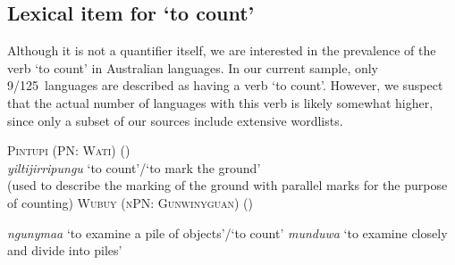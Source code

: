 \documentclass[12pt,egregdoesnotlikesansseriftitles]{scrartcl}
\newcommand{\ofy}{/125} %
\begin{document}



\subsection{Lexical item for `to count'}

Although it is not a quantifier itself, we are interested in the prevalence of the verb `to count' in Australian languages. In our current sample, only 9\ofy\ languages are described as having a verb `to count'. However, we suspect that the actual number of languages with this verb is likely somewhat higher, since only a subset of our sources include extensive wordlists.


\begin{exe}
  \ex \textsc{Pintupi (PN: Wati)} \hfill (\citealt[179]{pintupi77})\\
  \textit{yiltijirripungu} `to count'/`to mark the ground'\\
  (used to describe the marking of the ground with parallel marks for the purpose of counting)
  \ex \textsc{Wubuy (nPN: Gunwinyguan)} \hfill (\citealt{nuydict})
  \begin{xlist}
     \ex \textit{ngunymaa} `to examine a pile of objects'/`to count'
    \ex \textit{munduwa} `to examine closely and divide into piles'
  \end{xlist}
\end{exe} 
\end{document}
